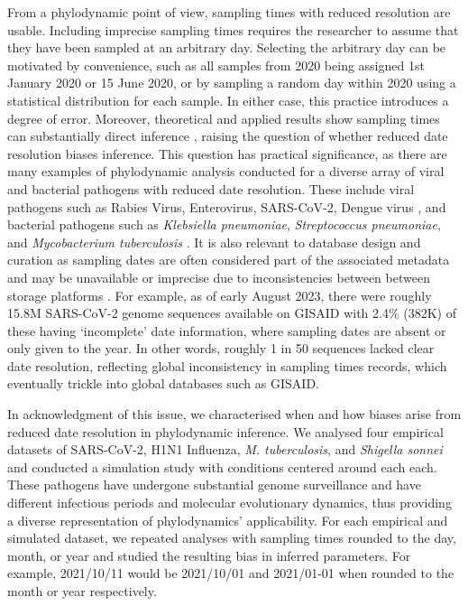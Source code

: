 \documentclass{article}
\begin{document}
\begin{spacing}{1.5}
From a phylodynamic point of view, sampling times with reduced resolution are usable. Including imprecise sampling times requires the researcher to assume that they have been sampled at an arbitrary day. Selecting the arbitrary day can be motivated by convenience, such as all samples from 2020 being assigned 1st January 2020 or 15 June 2020, or by sampling a random day within 2020 using a statistical distribution for each sample. In either case, this practice introduces a degree of error. Moreover, theoretical and applied results show sampling times can substantially direct inference \citep{featherstone_decoding_2023,featherstone_infectious_2021,volz_sampling_2014}, raising the question of whether reduced date resolution biases inference. This question has practical significance, as there are many examples of phylodynamic analysis conducted for a diverse array of viral and bacterial pathogens with reduced date resolution. These include viral pathogens such as Rabies Virus, Enterovirus, SARS-CoV-2, Dengue virus \citep{talbi_phylodynamics_2010,xiao_genomic_2022,wolf_temporal_2022,bennett_epidemic_2010}, and bacterial pathogens such as \textit{Klebsiella pneumoniae}, \textit{Streptococcus pneumoniae}, and \textit{Mycobacterium tuberculosis} \citep{cella_multi-drug_2017,azarian_impact_2018,merker_evolutionary_2015}. It is also relevant to database design and curation as sampling dates are often considered part of the associated metadata and may be unavailable or imprecise due to inconsistencies between between storage platforms \citep{raza2016big}. For example, as of early August 2023, there were roughly 15.8M SARS-CoV-2 genome sequences available on GISAID with 2.4\% (382K) of these having `incomplete' date information, where sampling dates are absent or only given to the year. In other words, roughly 1 in 50 sequences lacked clear date resolution, reflecting global inconsistency in sampling times records, which eventually trickle into global databases such as GISAID.

In acknowledgment of this issue, we characterised when and how biases arise from reduced date resolution in phylodynamic inference. We analysed four empirical datasets of SARS-CoV-2, H1N1 Influenza, \textit{M. tuberculosis}, and \textit{Shigella sonnei} and conducted a simulation study with conditions centered around each each. These pathogens have undergone substantial genome surveillance and have different infectious periods and molecular evolutionary dynamics, thus providing a diverse representation of phylodynamics' applicability. For each empirical and simulated dataset, we repeated analyses with sampling times rounded to the day, month, or year and studied the resulting bias in inferred parameters. For example, 2021/10/11 would be 2021/10/01 and 2021/01-01 when rounded to the month or year respectively.


\end{spacing}
\end{document}
